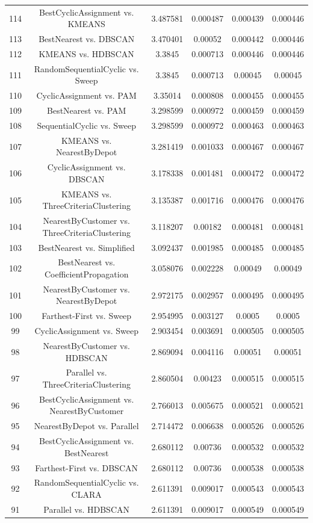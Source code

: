 \documentclass[a4paper,10pt]{article}
\begin{document}
\begin{landscape}
\begin{table}[!htp]
\begin{tabular}{cccccc}
114&BestCyclicAssignment vs. KMEANS&3.487581&0.000487&0.000439&0.000446\\
113&BestNearest vs. DBSCAN&3.470401&0.00052&0.000442&0.000446\\
112&KMEANS vs. HDBSCAN&3.3845&0.000713&0.000446&0.000446\\
111&RandomSequentialCyclic vs. Sweep&3.3845&0.000713&0.00045&0.00045\\
110&CyclicAssignment vs. PAM&3.35014&0.000808&0.000455&0.000455\\
109&BestNearest vs. PAM&3.298599&0.000972&0.000459&0.000459\\
108&SequentialCyclic vs. Sweep&3.298599&0.000972&0.000463&0.000463\\
107&KMEANS vs. NearestByDepot&3.281419&0.001033&0.000467&0.000467\\
106&CyclicAssignment vs. DBSCAN&3.178338&0.001481&0.000472&0.000472\\
105&KMEANS vs. ThreeCriteriaClustering&3.135387&0.001716&0.000476&0.000476\\
104&NearestByCustomer vs. ThreeCriteriaClustering&3.118207&0.00182&0.000481&0.000481\\
103&BestNearest vs. Simplified&3.092437&0.001985&0.000485&0.000485\\
102&BestNearest vs. CoefficientPropagation&3.058076&0.002228&0.00049&0.00049\\
101&NearestByCustomer vs. NearestByDepot&2.972175&0.002957&0.000495&0.000495\\
100&Farthest-First vs. Sweep&2.954995&0.003127&0.0005&0.0005\\
99&CyclicAssignment vs. Sweep&2.903454&0.003691&0.000505&0.000505\\
98&NearestByCustomer vs. HDBSCAN&2.869094&0.004116&0.00051&0.00051\\
97&Parallel vs. ThreeCriteriaClustering&2.860504&0.00423&0.000515&0.000515\\
96&BestCyclicAssignment vs. NearestByCustomer&2.766013&0.005675&0.000521&0.000521\\
95&NearestByDepot vs. Parallel&2.714472&0.006638&0.000526&0.000526\\
94&BestCyclicAssignment vs. BestNearest&2.680112&0.00736&0.000532&0.000532\\
93&Farthest-First vs. DBSCAN&2.680112&0.00736&0.000538&0.000538\\
92&RandomSequentialCyclic vs. CLARA&2.611391&0.009017&0.000543&0.000543\\
91&Parallel vs. HDBSCAN&2.611391&0.009017&0.000549&0.000549\\

\end{tabular}
\end{table}
\end{landscape}
\end{document}
